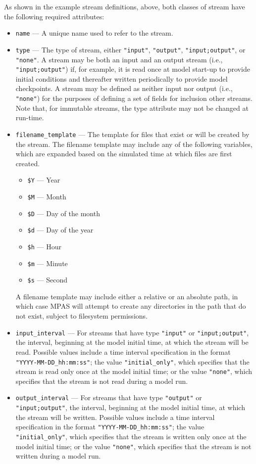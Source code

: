 As shown in the example stream definitions, above, both classes of stream have the following required attributes:

\begin{itemize}
\item {\tt name} --- A unique name used to refer to the stream.
\item {\tt type} --- The type of stream, either {\tt "input"}, {\tt "output"}, {\tt "input;output"}, or {\tt "none"}. A stream may be both an input
and an output stream (i.e., {\tt "input;output"}) if, for example, it is read once at model start-up to provide initial conditions and thereafter written 
periodically to provide model checkpoints. A stream may be defined as neither input nor output (i.e., {\tt "none"}) for the purposes of defining a 
set of fields for inclusion other streams. Note that, for immutable streams, the type attribute may not be changed at run-time.
\item {\tt filename\_template} --- The template for files that exist or will be created by the stream. The filename template may include any of the
following variables, which are expanded based on the simulated time at which files are first created.
\begin{itemize}
\item {\tt \$Y} --- Year
\item {\tt \$M} --- Month
\item {\tt \$D} --- Day of the month
\item {\tt \$d} --- Day of the year
\item {\tt \$h} --- Hour
\item {\tt \$m} --- Minute
\item {\tt \$s} --- Second
\end{itemize}
A filename template may include either a relative or an absolute path, in which case MPAS will attempt to create any directories 
in the path that do not exist, subject to filesystem permissions.
\item {\tt input\_interval} --- For streams that have type {\tt "input"} or {\tt "input;output"}, the interval, beginning at the model initial time,
at which the stream will be read. Possible values include a time interval specification in the format {\tt "YYYY-MM-DD\_hh:mm:ss"}; the value 
{\tt "initial\_only"}, which specifies that the stream is read only once at the model initial time; or the value {\tt "none"}, which specifies that 
the stream is not read during a model run.
\item {\tt output\_interval} --- For streams that have type {\tt "output"} or {\tt "input;output"}, the interval, beginning at the model initial time,
at which the stream will be written. Possible values include a time interval specification in the format {\tt "YYYY-MM-DD\_hh:mm:ss"}; the value 
{\tt "initial\_only"}, which specifies that the stream is written only once at the model initial time; or the value {\tt "none"}, which specifies that 
the stream is not written during a model run.
\end{itemize}

